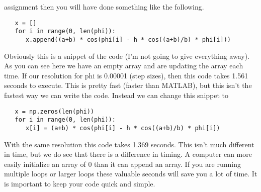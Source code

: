 \documentclass[11pt]{article}   %
\begin{document}
assignment then you will have done something like the following.
\begin{tcolorbox}
   \begin{lstlisting}
   x = []
   for i in range(0, len(phi)):
      x.append((a+b) * cos(phi[i] - h * cos((a+b)/b) * phi[i]))
   \end{lstlisting}
\end{tcolorbox}
Obviously this is a snippet of the code (I'm not going to give everything away).  As you can see here we have an empty array and are updating the array each time.  If our resolution for 
phi is 0.00001 (step sizes), then this code takes 1.561 seconds to execute. This is pretty fast (faster than MATLAB), but this isn't the fastest way we can write the code.  Instead
we can change this snippet to
\begin{tcolorbox}
   \begin{lstlisting}
   x = np.zeros(len(phi))
   for i in range(0, len(phi)):
      x[i] = (a+b) * cos(phi[i] - h * cos((a+b)/b) * phi[i])
   \end{lstlisting}
\end{tcolorbox}
With the same resolution this code takes 1.369 seconds. This isn't much different in time, but we do see that there is a difference in timing.  A computer can more easily initialize an
array of 0 than it can append an array.  If you are running multiple loops or larger loops these valuable seconds will save you a lot of time.  It is important to keep your code quick and
simple.  
\end{document}
